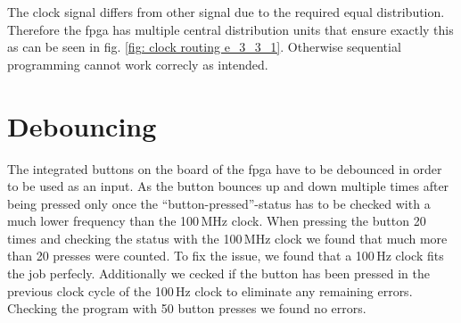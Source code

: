 The clock signal differs from other signal due to the required equal distribution. Therefore the \gls{fpga} has multiple central distribution units that ensure exactly this as can be seen in fig. \ref{fig: clock routing e_3_3_1}. Otherwise sequential programming cannot work correcly as intended.

\section{Debouncing}

The integrated buttons on the board of the \gls{fpga} have to be debounced in order to be used as an input. As the button bounces up and down multiple times after being pressed only once the ``button-pressed''-status has to be checked with a much lower frequency than the 100\,MHz clock. When pressing the button 20 times and checking the status with the 100\,MHz clock we found that much more than 20 presses were counted. To fix the issue, we found that a 100\,Hz clock fits the job perfecly. Additionally we cecked if the button has been pressed in the previous clock cycle of the 100\,Hz clock to eliminate any remaining errors. Checking the program with 50 button presses we found no errors.

